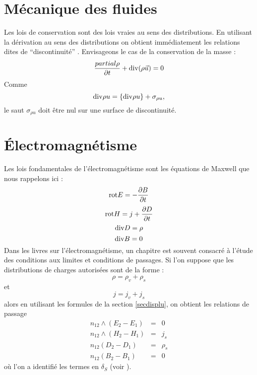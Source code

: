 \documentclass[12pt]{book}
\begin{document}
\section{M\'ecanique des fluides}
Les lois de conservation sont des lois vraies au sens des
distributions. En utilisant la d\'erivation au sens des distributions
on obtient imm\'ediatement les relations dites de ``discontinuit\'e''
\cite{ph:fluid:Germain80}.
Envisageons le cas de la conservation de la masse :
\begin{equation}
\frac{partial \rho}{\partial t}+{\rm div}(\rho \vec{u})=0
\end{equation}
Comme 
\begin{equation}
{\rm div} \rho {u}=\{{\rm div} \rho {u}\}+\sigma_{\rho u},
\end{equation}
le saut $\sigma_{\rho u}$ doit \^etre nul sur une surface de discontinuit\'e.

\section{\'Electromagn\'etisme}
Les lois fondamentales de l'\'electromagn\'etisme sont les \'equations
de Maxwell que nous rappelons ici :
\begin{equation}
{\rm rot} E=-\frac{\partial B}{\partial t}
\end{equation}
\begin{equation}
{\rm rot} H=j+\frac{\partial D}{\partial t}
\end{equation}
\begin{equation}
{\rm div} D=\rho
\end{equation}
\begin{equation}
{\rm div} B=0
\end{equation}
Dans les livres sur l'\'electromagn\'etisme, un chapitre est souvent
consacr\'e \`a l'\'etude des conditions aux limites et conditions de
passages. Si l'on suppose que les distributions de charges autoris\'ees
sont de la forme :
\begin{equation}
\rho=\rho_v+\rho_s
\end{equation}
et
\begin{equation}
j=j_v+j_s
\end{equation}
alors en utilisant les formules de la section
\ref{secdisplu}, on obtient les relations de passage 
\begin{eqnarray}
n_{12}\wedge(E_2-E_1)&=&0\\
n_{12}\wedge(H_2-H_1)&=&j_s\\
n_{12}(D_2-D_1)&=&\rho_s\\
n_{12}(B_2-B_1)&=&0
\end{eqnarray}
o\`u l'on a identifi\'e les termes en $\delta_S$
(voir \cite{ma:distr:Petit91}).
\end{document}
